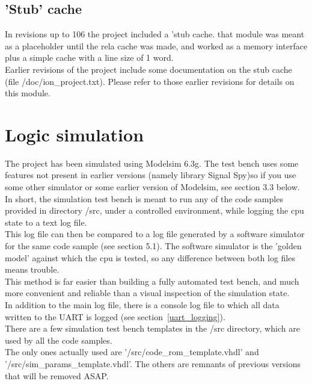 \documentclass[11pt]{article}
\begin{document}
    
\subsection{'Stub' cache}
\label{stub_cache}

    In revisions up to 106 the project included a 'stub cache. that module was 
    meant as a placeholder until the rela cache was made, and worked as a 
    memory interface plus a simple cache with a line size of 1 word.\\
    
    Earlier revisions of the project include some documentation on the stub 
    cache (file /doc/ion\_project.txt). Please refer to those earlier revisions
    for details on this module.\\

\section{Logic simulation}
\label{logic_simulation}

    The project has been simulated using Modelsim 6.3g. The test bench
    uses some features not present in earlier versions (namely library Signal 
    Spy)so if you use some other simulator or some earlier version of Modelsim, 
    see section 3.3 below.\\

    In short, the simulation test bench is meant to run any of the code samples
    provided in directory /src, under a controlled environment, while logging
    the cpu state to a text log file.\\

    This log file can then be compared to a log file generated by a software
    simulator for the same code sample (see section 5.1). The software
    simulator is the 'golden model' against which the cpu is tested, so any
    difference between both log files means trouble.\\

    This method is far easier than building a fully automated test bench, and
    much more convenient and reliable than a visual inspection of the simulation
    state.\\
    
    In addition to the main log file, there is a console log file to which all 
    data written to the UART is logged (see section~\ref{uart_logging}).\\

    There are a few simulation test bench templates in the /src directory, which 
    are used by all the code samples.\\
    The only ones actually used are '/src/code\_rom\_template.vhdl' and 
    '/src/sim\_params\_template.vhdl'. The others
    are remnants of previous versions that will be removed ASAP.\\
    
\end{document}
